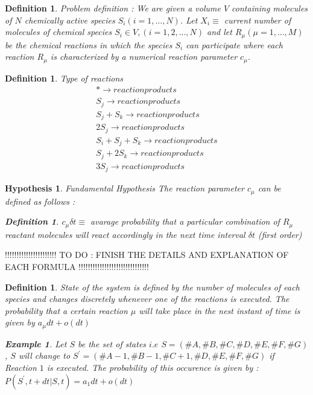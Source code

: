 \documentclass[11pt,a4paper]{article}
\newtheorem{defn}[theorem]{Definition}
\newtheorem{example}[theorem]{Example}
\newtheorem{hyp}[theorem]{Hypothesis}
\begin{document}
\begin{defn}{Problem definition : }
We are given a volume $V$ containing molecules of $N$ chemically active species $S_{i}(i = 1, \dots, N)$. Let $X_{i} \equiv$ current number of molecules of chemical species $S_{i} \in V, (i = 1, 2, \dots, N)$ and let $R_{\mu} (\mu = 1, \dots, M)$ be the chemical reactions in which the species $S_{i}$ can participate where each reaction $R_{\mu}$ is characterized by a numerical reaction parameter $c_{\mu}$.
\end{defn}
\begin{defn}{Type of reactions}
\begin{gather}
  {* \rightarrow reaction products}  \\
  {S_{j} \rightarrow reaction products} \\
  {S_{j} + S_{k} \rightarrow reaction products}\\
  {2S_{j} \rightarrow reaction products} \\
  {S_{i} + S_{j} + S_{k} \rightarrow reaction products}\\
  {S_{j} + 2S_{k} \rightarrow reaction products} \\
  {3S_{j} \rightarrow reaction products}
\end{gather}
\end{defn}

\begin{hyp}{Fundamental Hypothesis}
The reaction parameter $c_{\mu}$ can be defined as follows :
\begin{defn} $c_{\mu} \delta t \equiv $ avarage probability that a particular combination of $R_{\mu}$ reactant molecules will react accordingly in the next time interval $\delta t$ (first order)
\end{defn}
\end{hyp}

!!!!!!!!!!!!!!!!!!!!!! TO DO : FINISH THE DETAILS AND EXPLANATION OF EACH FORMULA !!!!!!!!!!!!!!!!!!!!!!!!!!!!!!

\begin{defn}State of the system is defined by the number of molecules of each species and changes discretely whenever one of the reactions is executed. The probability that a certain reaction $\mu$ will take place in the nest instant of time is given by $a_{\mu}dt + o(dt)$

  \begin{example} Let $S$ be the set of states $i.e$ $S = (\#A, \#B, \#C, \#D, \#E, \#F, \#G)$, $S$ will change to $S^{'} = (\#A-1, \#B-1, \#C+1, \#D, \#E, \#F, \#G)$ if Reaction $1$ is executed. The probability of this occurence is given by :
  $P(S^{'}, t + dt|S,t) = a_{1}dt + o(dt)$
  \end{example}
\end{defn}
\end{document}
